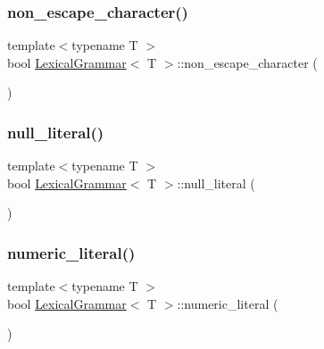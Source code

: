 \subsubsection{\texorpdfstring{non\+\_\+escape\+\_\+character()}{non\_escape\_character()}}
{\footnotesize\ttfamily template$<$typename T $>$ \\
bool \hyperlink{class_lexical_grammar}{Lexical\+Grammar}$<$ T $>$\+::non\+\_\+escape\+\_\+character (\begin{DoxyParamCaption}{ }\end{DoxyParamCaption})\hspace{0.3cm}{\ttfamily [inline]}}

\mbox{\label{class_lexical_grammar_a2bd963802a60b5d0e1476bdf3019494b}} 
\subsubsection{\texorpdfstring{null\+\_\+literal()}{null\_literal()}}
{\footnotesize\ttfamily template$<$typename T $>$ \\
bool \hyperlink{class_lexical_grammar}{Lexical\+Grammar}$<$ T $>$\+::null\+\_\+literal (\begin{DoxyParamCaption}{ }\end{DoxyParamCaption})\hspace{0.3cm}{\ttfamily [inline]}}

\mbox{\label{class_lexical_grammar_a6dd9a9a8baf50e9a99e0df2cbaa8d795}} 
\subsubsection{\texorpdfstring{numeric\+\_\+literal()}{numeric\_literal()}}
{\footnotesize\ttfamily template$<$typename T $>$ \\
bool \hyperlink{class_lexical_grammar}{Lexical\+Grammar}$<$ T $>$\+::numeric\+\_\+literal (\begin{DoxyParamCaption}{ }\end{DoxyParamCaption})\hspace{0.3cm}{\ttfamily [inline]}}

